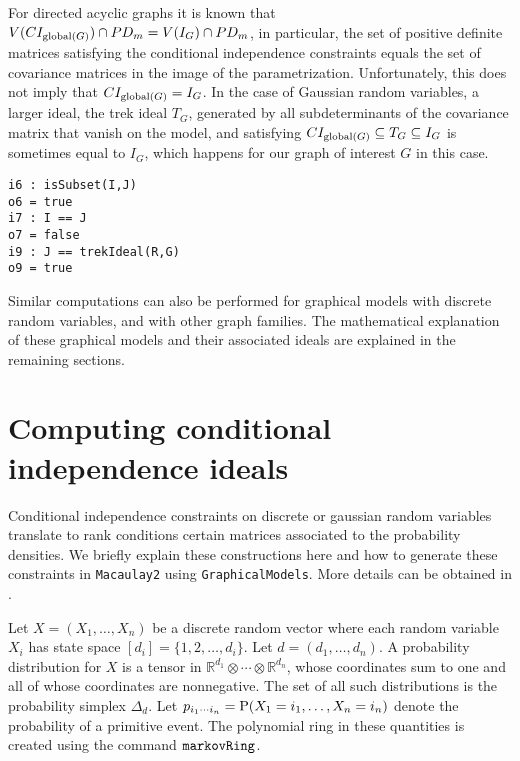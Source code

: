 \documentclass[letterpaper]{article}
\theoremstyle{definition}
\begin{document}
For directed acyclic graphs it is known that 
$V(CI_{{\rm global}(G)}) \cap PD_{m}  =  
V(I_{G}) \cap PD_{m}$,
in particular, the set of positive definite matrices
satisfying the conditional independence constraints equals the set of covariance matrices in the image of the parametrization.
Unfortunately, this does not imply that $CI_{{\rm global}(G)} 
=I_{G}$.  In the case of Gaussian random variables, a larger ideal,
the trek ideal $T_{G}$, generated by all subdeterminants of the 
covariance matrix that vanish on the model, and satisfying
$CI_{{\rm global}(G)} \subseteq T_{G} \subseteq
I_{G}$ is sometimes equal to $I_{G}$, which happens for our
graph of interest $G$ in this case.

\begin{verbatim}
i6 : isSubset(I,J)
o6 = true
i7 : I == J
o7 = false
i9 : J == trekIdeal(R,G)
o9 = true
\end{verbatim}

Similar computations can also be performed for graphical models
with discrete random variables,
and with other graph families.  The mathematical explanation of
these graphical models and their associated ideals
are explained in the remaining sections.


\section{Computing conditional independence ideals}

Conditional independence constraints on discrete or gaussian
random variables translate to rank conditions certain matrices
associated to the probability densities.  We briefly explain
these constructions here and how to generate these constraints
in {\tt Macaulay2} using {\tt GraphicalModels}.  More details
can be obtained in \cite[Ch.~3]{DSS}.

Let $X = (X_{1}, \ldots, X_{n})$ be a discrete random
vector where each random variable $X_{i}$ has state space
$[d_{i}] = \{1,2, \ldots, d_{i} \}$. Let $d = (d_{1}, \ldots, d_{n})$.  
A probability distribution
for $X$ is a tensor in $\mathbb{R}^{d_{1}} \otimes \cdots \otimes \mathbb{R}^{d_{n}}$,
whose coordinates sum to one and all of whose coordinates are nonnegative.
The set of all such distributions is the probability simplex $\Delta_{d}$.
Let $p_{i_{1}\cdots i_{n}} = {\rm P}(X_{1} = i_{1}, \ldots, X_{n} = i_{n})$
denote the probability of a primitive event.  The polynomial
ring in these quantities is created using the command ${\tt markovRing}$.
\end{document}
